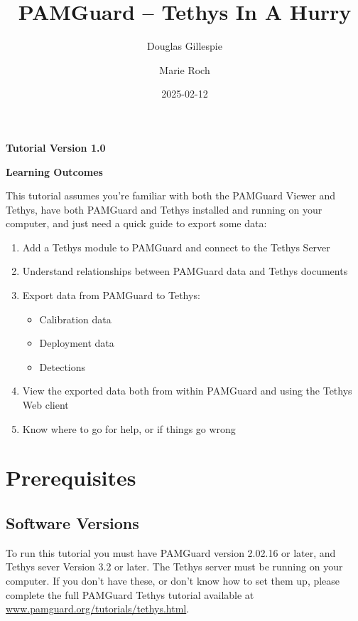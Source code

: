 \documentclass[
]{article}
\title{PAMGuard -- Tethys In A Hurry}
\author[1]{Douglas Gillespie}
\author[2]{Marie Roch}
\affil[1]{Sea Mammal Research Unit, University of St Andrews}
\affil[2]{Department of Computer Science, San Diego State University}
\date{2025-02-12}
\renewcommand*\contentsname{Table of contents}
\newcommand\contentsname{Table of contents}
\begin{document}
\maketitle

\centerline{\textbf{Tutorial Version 1.0}}
\vspace{3cm}

\centerline{\textbf{Learning Outcomes}}

This tutorial assumes you're familiar with both the PAMGuard Viewer and Tethys,
have both PAMGuard and Tethys installed and
running on your computer, and just need a quick guide to export some data:
\begin{enumerate}
\item Add a Tethys module to PAMGuard and connect to the Tethys Server
\item Understand relationships between PAMGuard data and Tethys documents
\item Export data from PAMGuard to Tethys:
\begin{itemize}
\item Calibration data
\item Deployment data
\item Detections
\end{itemize}
\item View the exported data both from within PAMGuard and using the Tethys Web client
\item Know where to go for help, or if things go wrong
\end{enumerate}
\newpage

\renewcommand*\contentsname{Table of contents}
{
\hypersetup{linkcolor=}
\setcounter{tocdepth}{3}
\tableofcontents
}
\listoffigures
\listoftables

\newpage{}

\pagestyle{plain}

\section{Prerequisites}\label{prerequisites}

\subsection{Software Versions}\label{software-versions}

To run this tutorial you must have PAMGuard version 2.02.16 or later,
and Tethys sever Version 3.2 or later. The Tethys server must be running
on your computer. If you don't have these, or don't know how to set them
up, please complete the full PAMGuard Tethys tutorial available at
\href{https://www.pamguard.org/tutorials/tethys.html}{www.pamguard.org/tutorials/tethys.html}.
\end{document}
